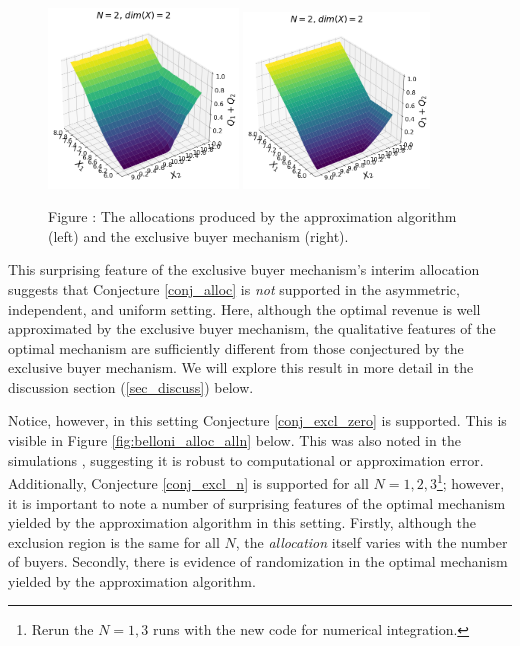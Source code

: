 \documentclass{article}
\newcounter{fig}
\begin{document}
\begin{figure}[H]
    \begin{center}
    \includegraphics[width=0.45\textwidth]{images/asymmetric_independent_belloni.png}
    \includegraphics[width=0.44\textwidth]{images/asymmetric_independent_belloni_ebm.png}
    \end{center}
    
    \vspace{1mm}
    \raggedright{\small {\sc Figure \thefig\label{fig:belloni_alloc}:} The allocations produced by the approximation algorithm (left) and the exclusive buyer mechanism (right).} 
\end{figure}

\noindent This surprising feature of the exclusive buyer mechanism's interim allocation suggests that Conjecture \ref{conj_alloc} is \textit{not} supported in the asymmetric, independent, and uniform setting. Here, although the optimal revenue is well approximated by the exclusive buyer mechanism, the qualitative features of the optimal mechanism are sufficiently different from those conjectured by the exclusive buyer mechanism. We will explore this result in more detail in the discussion section (\ref{sec_discuss}) below.

Notice, however, in this setting Conjecture \ref{conj_excl_zero} is supported. This is visible in Figure \ref{fig:belloni_alloc_alln} below. This was also noted in the simulations \autocite{belloni2010multidimensional}, suggesting it is robust to computational or approximation error. Additionally, Conjecture \ref{conj_excl_n} is supported for all $N=1,2,3$\footnote{\color{red}Rerun the $N=1,3$ runs with the new code for numerical integration.}; however, it is important to note a number of surprising features of the optimal mechanism yielded by the approximation algorithm in this setting. Firstly, although the exclusion region is the same for all $N$, the \textit{allocation} itself varies with the number of buyers. Secondly, there is evidence of randomization in the optimal mechanism yielded by the approximation algorithm. 
\end{document}
